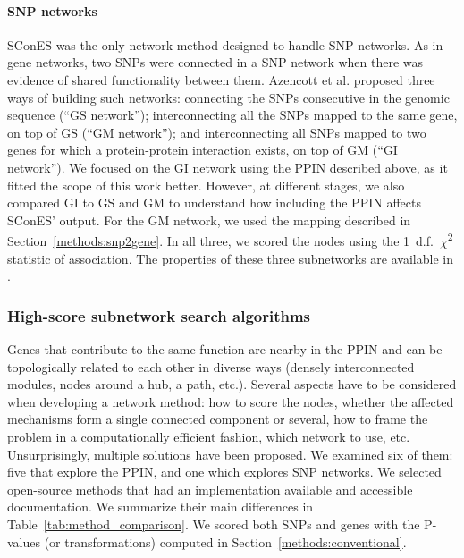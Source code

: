 \documentclass[10pt,letterpaper]{article}
\begin{document}
\paragraph{SNP networks}
SConES \cite{azencott_efficient_2013} was the only network method designed to handle SNP networks. As in gene networks, two SNPs were connected in a SNP network when there was evidence of shared functionality between them. Azencott et al. \cite{azencott_efficient_2013} proposed three ways of building such networks: connecting the SNPs consecutive in the genomic sequence (``GS network''); interconnecting all the SNPs mapped to the same gene, on top of GS (``GM network''); and interconnecting all SNPs mapped to two genes for which a protein-protein interaction exists, on top of GM (``GI network''). We focused on the GI network using the PPIN described above, as it fitted the scope of this work better. However, at different stages, we also compared GI to GS and GM to understand how including the PPIN affects SConES' output. For the GM network, we used the mapping described in Section~\ref{methods:snp2gene}. In all three, we scored the nodes using the 1~d.f.~\(\chi\)\textsuperscript{2} statistic of association. The properties of these three subnetworks are available in .

\subsubsection{High-score subnetwork search algorithms}
\label{methods:methods}

Genes that contribute to the same function are nearby in the PPIN and can be topologically related to each other in diverse ways (densely interconnected modules, nodes around a hub, a path, etc.). Several aspects have to be considered when developing a network method: how to score the nodes, whether the affected mechanisms form a single connected component or several, how to frame the problem in a computationally efficient fashion, which network to use, etc. Unsurprisingly, multiple solutions have been proposed. We examined six of them: five that explore the PPIN, and one which explores SNP networks. We selected open-source methods that had an implementation available and accessible documentation. We summarize their main differences in Table~\ref{tab:method_comparison}. We scored both SNPs and genes with the P-values (or transformations) computed in Section~\ref{methods:conventional}.
\end{document}
